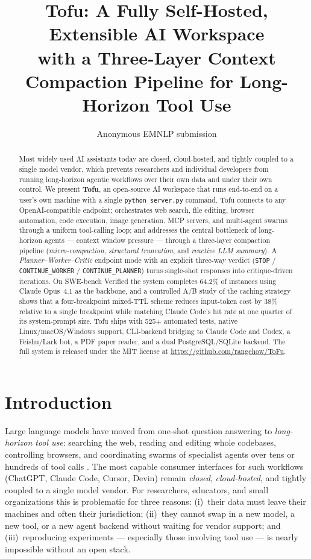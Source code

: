 \documentclass[11pt]{article}
\title{Tofu: A Fully Self-Hosted, Extensible AI Workspace \\
with a Three-Layer Context Compaction Pipeline for Long-Horizon Tool Use}
\author{
  Anonymous EMNLP submission \\
}
\begin{document}
\maketitle

\begin{abstract}
Most widely used AI assistants today are closed, cloud-hosted, and tightly
coupled to a single model vendor, which prevents researchers and individual
developers from running long-horizon agentic workflows over their own data
and under their own control. We present \textbf{Tofu},
an open-source AI workspace that runs end-to-end on a user's own machine
with a single \texttt{python server.py} command. Tofu connects to any
OpenAI-compatible endpoint; orchestrates web search, file editing, browser
automation, code execution, image generation, MCP servers, and multi-agent
swarms through a uniform tool-calling loop; and addresses the central
bottleneck of long-horizon agents --- context window pressure --- through a
three-layer compaction pipeline (\emph{micro-compaction}, \emph{structural
truncation}, and \emph{reactive LLM summary}). A \emph{Planner--Worker--Critic}
endpoint mode with an explicit three-way verdict (\texttt{STOP} /
\texttt{CONTINUE\_WORKER} / \texttt{CONTINUE\_PLANNER}) turns single-shot
responses into critique-driven iterations. On SWE-bench Verified the system
completes 64.2\% of instances using Claude Opus~4.1 as the backbone, and a
controlled A/B study of the caching strategy shows that a four-breakpoint
mixed-TTL scheme reduces input-token cost by 38\% relative to a single
breakpoint while matching Claude Code's hit rate at one quarter of its
system-prompt size. Tofu ships with 525+ automated tests, native
Linux/macOS/Windows support, CLI-backend bridging to Claude Code and Codex,
a Feishu/Lark bot, a PDF paper reader, and a dual PostgreSQL/SQLite
backend. The full system is released under the MIT license at
\url{https://github.com/rangehow/ToFu}.
\end{abstract}

\section{Introduction}

Large language models have moved from one-shot question answering to
\emph{long-horizon tool use}: searching the web, reading and editing whole
codebases, controlling browsers, and coordinating swarms of specialist
agents over tens or hundreds of tool calls
\citep{yao2023react,lewis2020retrieval}. The most capable consumer
interfaces for such workflows (ChatGPT, Claude Code, Cursor, Devin) remain
\emph{closed}, \emph{cloud-hosted}, and tightly coupled to a single model
vendor. For researchers, educators, and small organizations this is
problematic for three reasons: (i)~their data must leave their machines
and often their jurisdiction; (ii)~they cannot swap in a new model, a new
tool, or a new agent backend without waiting for vendor support; and
(iii)~reproducing experiments --- especially those involving tool use --- is
nearly impossible without an open stack.
\end{document}
